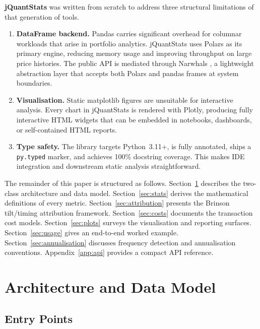 \documentclass[11pt,a4paper]{article}
\begin{document}
\textbf{jQuantStats} was written from scratch to address three structural
limitations of that generation of tools.

\begin{enumerate}[leftmargin=*, label=\arabic{*}.]
  \item \textbf{DataFrame backend.}  Pandas carries significant overhead for
    columnar workloads that arise in portfolio analytics.  jQuantStats uses
    Polars \citep{polars2024} as its primary engine, reducing memory usage and
    improving throughput on large price histories.  The public API is mediated
    through Narwhals \citep{narwhals2024}, a lightweight abstraction layer that
    accepts both Polars and pandas frames at system boundaries.
  \item \textbf{Visualisation.}  Static matplotlib figures are unsuitable for
    interactive analysis.  Every chart in jQuantStats is rendered with Plotly,
    producing fully interactive HTML widgets that can be embedded in notebooks,
    dashboards, or self-contained HTML reports.
  \item \textbf{Type safety.}  The library targets Python~3.11+, is fully
    annotated, ships a \texttt{py.typed} marker, and achieves 100\% docstring
    coverage.  This makes IDE integration and downstream static analysis
    straightforward.
\end{enumerate}

The remainder of this paper is structured as follows.
Section~\ref{sec:arch} describes the two-class architecture and data model.
Section~\ref{sec:stats} derives the mathematical definitions of every metric.
Section~\ref{sec:attribution} presents the Brinson tilt/timing attribution
framework.
Section~\ref{sec:costs} documents the transaction cost models.
Section~\ref{sec:plots} surveys the visualisation and reporting surfaces.
Section~\ref{sec:usage} gives an end-to-end worked example.
Section~\ref{sec:annualisation} discusses frequency detection and annualisation
conventions.
Appendix~\ref{app:api} provides a compact API reference.

\section{Architecture and Data Model}
\label{sec:arch}

\subsection{Entry Points}
\end{document}
